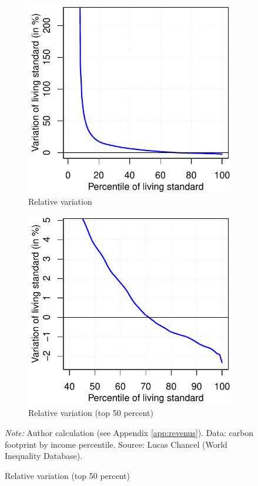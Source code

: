 \documentclass[a5paper,english,openany]{memoir}
\begin{document}
\begin{figure}[h!]
\begin{subfigure}{.5\textwidth}
\end{subfigure}
\quad \quad
\begin{subfigure}{.5\textwidth}
  \caption[]{Relative variation}\label{fig:evol_distr_c}
  \includegraphics[width=\textwidth]{../figures/policies/gcp_var_rev_en.pdf}
\end{subfigure} \quad
\begin{subfigure}{.5\textwidth}
  \caption[]{Relative variation (top 50 percent)}\label{fig:evol_distr_d}
  \includegraphics[width=\textwidth]{../figures/policies/gcp_var_rev_rich_only_en.pdf}
\end{subfigure}
{\footnotesize \textit{Note:} Author calculation
(see %
Appendix \ref{app:revenus}). Data: carbon footprint by income percentile. Source: Lucas Chancel (World Inequality Database).}
\end{figure}
\end{document}
